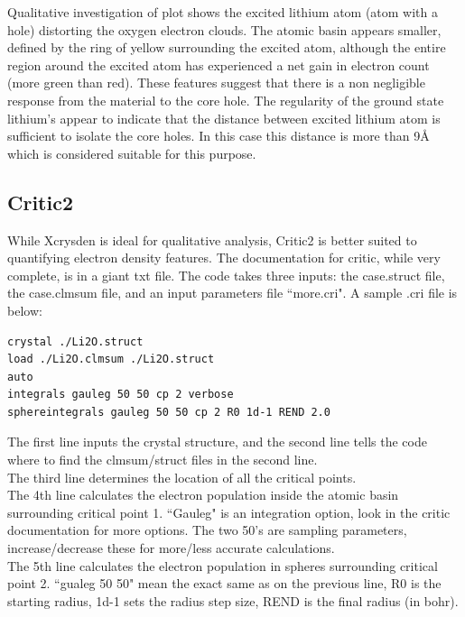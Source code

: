 \documentclass[12pt]{article}
\newcommand{\angstrom}{\mbox{\normalfont\AA }} %
\begin{document}
Qualitative investigation of plot shows the excited lithium atom (atom with a hole) distorting the oxygen electron clouds. The atomic basin appears smaller, defined by the ring of yellow surrounding the excited atom, although the entire region around the excited atom has experienced a net gain in electron count (more green than red).   These features suggest that there is a non negligible response from the material to the core hole.  The regularity of the ground state lithium's appear to indicate that the distance between excited lithium atom is sufficient to isolate the core holes.  In this case this distance is more than 9\angstrom  { }which is considered suitable for this purpose.

\subsection{Critic2}
While Xcrysden is ideal for qualitative analysis, Critic2 is better suited to quantifying electron density features. The documentation for critic, while very complete, is in a giant txt file. The code takes three inputs: the case.struct file, the case.clmsum file, and an input parameters file ``more.cri".  A sample .cri file is below: 

\begin{lstlisting}
crystal ./Li2O.struct
load ./Li2O.clmsum ./Li2O.struct
auto
integrals gauleg 50 50 cp 2 verbose
sphereintegrals gauleg 50 50 cp 2 R0 1d-1 REND 2.0
\end{lstlisting}

The first line inputs the crystal structure, and the second line tells the code where to find the clmsum/struct files in the second line.  \\

The third line determines the location of all the critical points.  \\

The 4th line calculates the electron population inside the atomic basin surrounding critical point 1.  ``Gauleg" is an integration option, look in the critic documentation for more options.  The two 50's are sampling parameters, increase/decrease these for more/less accurate calculations.  \\

The 5th line calculates the electron population in spheres surrounding critical point 2. ``gualeg 50 50" mean the exact same as on the previous line, R0 is the starting radius, 1d-1 sets the radius step size, REND is the final radius (in bohr).\\
\end{document}

